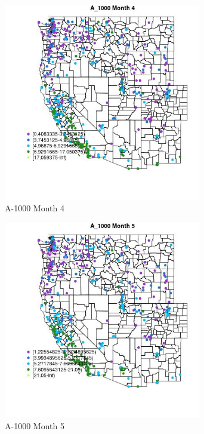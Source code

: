 \begin{figure} 
\centering  
\includegraphics[width=0.77\textwidth]{Code_Outputs/ML_input_report_ML_input_PM25_Step5_part_d_de_duplicated_aves_ML_input_MapObsMo4A_1000.jpg} 
\caption{\label{fig:ML_input_report_ML_input_PM25_Step5_part_d_de_duplicated_aves_ML_inputMapObsMo4A_1000}A-1000 Month 4} 
\end{figure} 
 

\begin{figure} 
\centering  
\includegraphics[width=0.77\textwidth]{Code_Outputs/ML_input_report_ML_input_PM25_Step5_part_d_de_duplicated_aves_ML_input_MapObsMo5A_1000.jpg} 
\caption{\label{fig:ML_input_report_ML_input_PM25_Step5_part_d_de_duplicated_aves_ML_inputMapObsMo5A_1000}A-1000 Month 5} 
\end{figure} 
 

